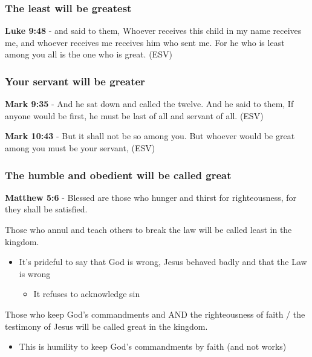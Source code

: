 \documentclass[11pt]{article}
\begin{document}
\subsubsection{The least will be greatest}
\label{sec:org74c69e9}
\textbf{Luke 9:48} - and said to them, Whoever receives this child in my name receives me, and whoever receives me receives him who sent me. For he who is least among you all is the one who is great. (ESV)

\subsubsection{Your servant will be greater}
\label{sec:org223586a}

\textbf{Mark 9:35} - And he sat down and called the twelve. And he said to them, If anyone would be first, he must be last of all and servant of all. (ESV)

\textbf{Mark 10:43} - But it shall not be so among you. But whoever would be great among you must be your servant, (ESV)

\subsubsection{The humble and obedient will be called great}
\label{sec:orgbd4a3cd}
\textbf{Matthew 5:6} - Blessed are those who hunger and thirst for righteousness, for they shall be satisfied.

Those who annul and teach others to break the law will be called least in the kingdom.
\begin{itemize}
\item It's prideful to say that God is wrong, Jesus behaved badly and that the Law is wrong
\begin{itemize}
\item It refuses to acknowledge sin
\end{itemize}
\end{itemize}
Those who keep God's commandments and AND the righteousness of faith / the testimony of Jesus will be called great in the kingdom.
\begin{itemize}
\item This is humility to keep God's commandments by faith (and not works)
\end{itemize}
\end{document}

